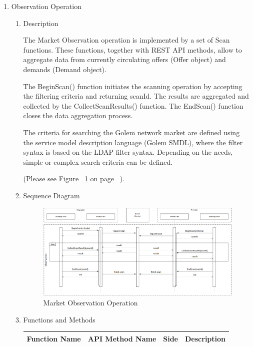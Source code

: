 \begin{enumerate}
\item  Observation Operation

\begin{enumerate}

\item Description

The Market Observation operation is implemented by a set of Scan functions. 
These functions, together with REST API methods, allow to aggregate data from currently circulating 
offers (Offer object) and demands (Demand object).

The BeginScan() function initiates the scanning operation by accepting the filtering criteria and 
returning scanId. The results are aggregated and collected by the CollectScanResults() function.
The EndScan() function closes the data aggregation process.

The criteria for searching the Golem network market are defined using the service model description language (Golem SMDL),
where the filter syntax is based on the LDAP filter syntax. Depending on the needs, simple or complex search criteria can be defined.

(Please see Figure ~\ref{fig:MOO} on page ~\pageref{fig:MOO}).

\item Sequence Diagram

\begin{figure}[htbp]
    \centering
    \includegraphics[width=14cm,angle=0]{./diag/Sequence/MarketObservation-B-Sequence.png}
	\caption{Market Observation Operation}
    \label{fig:MOO}
\end{figure}

\item Functions and Methods

\begin{center}
\begin{tabular}{|p{3cm}|p{7cm}|p{1.5cm}|p{4cm}|} 
\hline
\rowcolor{lightgray}	Function Name	& API Method Name	& 	Side	&	Description \\
\hline


\end{tabular}
\end{center}
\end{enumerate}
\end{enumerate}
